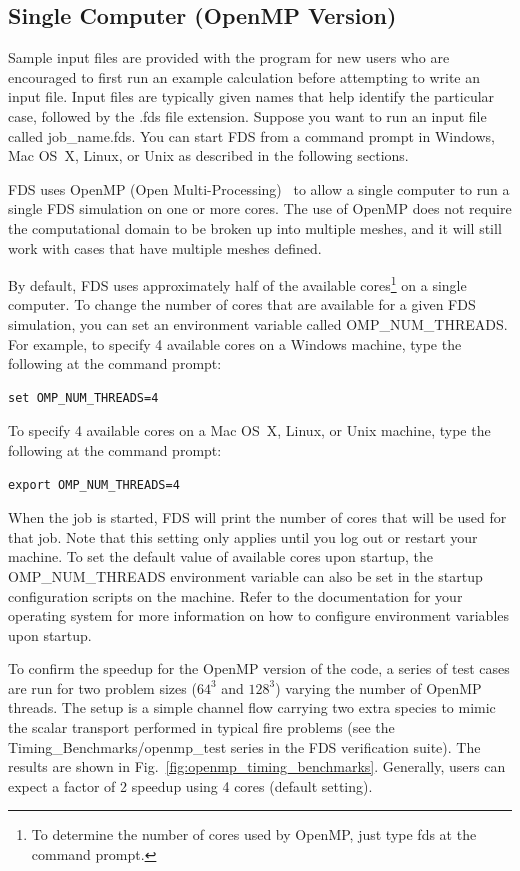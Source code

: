 \documentclass[11pt]{book}
\begin{document}
\subsection{Single Computer (OpenMP Version)}

Sample input files are provided with the program for new users who are encouraged to first run an example calculation before attempting to write an input file. Input files are typically given names that help identify the particular case, followed by the {\ct .fds} file extension. Suppose you want to run an input file called {\ct job\_name.fds}. You can start FDS from a command prompt in Windows, Mac OS~X, Linux, or Unix as described in the following sections.

FDS uses OpenMP (Open Multi-Processing)~\cite{Chapman:OpenMP} to allow a single computer to run a single FDS simulation on one or more cores. The use of OpenMP does not require the computational domain to be broken up into multiple meshes, and it will still work with cases that have multiple meshes defined.

By default, FDS uses approximately half of the available cores\footnote{To determine the number of cores used by OpenMP, just type {\ct fds} at the command prompt.} on a single computer. To change the number of cores that are available for a given FDS simulation, you can set an environment variable called {\ct OMP\_NUM\_THREADS}. For example, to specify 4 available cores on a Windows machine, type the following at the command prompt:
\begin{lstlisting}
set OMP_NUM_THREADS=4
\end{lstlisting}
To specify 4 available cores on a Mac OS~X, Linux, or Unix machine, type the following at the command prompt:
\begin{lstlisting}
export OMP_NUM_THREADS=4
\end{lstlisting}
When the job is started, FDS will print the number of cores that will be used for that job. Note that this setting only applies until you log out or restart your machine. To set the default value of available cores upon startup, the {\ct OMP\_NUM\_THREADS} environment variable can also be set in the startup configuration scripts on the machine. Refer to the documentation for your operating system for more information on how to configure environment variables upon startup.

To confirm the speedup for the OpenMP version of the code, a series of test cases are run for two problem sizes ($64^3$ and $128^3$) varying the number of OpenMP threads.  The setup is a simple channel flow carrying two extra species to mimic the scalar transport performed in typical fire problems (see the {\ct Timing\_Benchmarks/openmp\_test} series in the FDS verification suite).  The results are shown in Fig.~\ref{fig:openmp_timing_benchmarks}.  Generally, users can expect a factor of 2 speedup using 4 cores (default setting).
\end{document}
